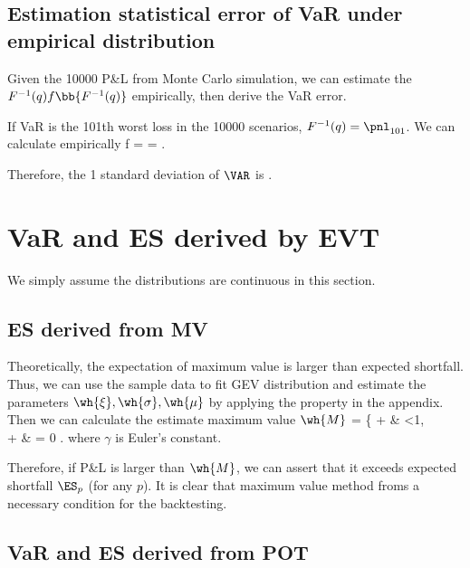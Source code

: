 \subsection{Estimation statistical error of VaR under empirical distribution}

Given the 10000 P\&L from Monte Carlo simulation, we can estimate the $F^{-1}(q)f\bb{F^{-1}(q)}$ empirically, then derive the VaR error.

If VaR is the 101th worst loss in the 10000 scenarios, $F^{-1}(q)= \pnl_{101}$. We can calculate empirically
\be
f =  = .
\ee

Therefore, the 1 standard deviation of $\VAR$ is
\be
{} \approx {} \approx {}   \cdot {}.
\ee


\section{VaR and ES derived by EVT}

We simply assume the distributions are continuous in this section.

\subsection{ES derived from MV}

Theoretically, the expectation of maximum value is larger than expected shortfall. Thus, we can use the sample data to fit GEV distribution and estimate the parameters $\wh{\xi},\wh{\sigma},\wh{\mu}$ by applying the property in the appendix. Then we can calculate the estimate maximum value $\wh{M}$
\be
{} = \left\{
\wh{\mu} + \wh{\sigma} \quad\quad & \wh{\xi} <1,\wh{\xi} \\
\wh{\mu} + \wh{\sigma} \gamma & \wh{\xi} = 0
\ea\right.
\ee
where $\gamma$ is Euler's constant.

Therefore, if P\&L is larger than $\wh{M}$, we can assert that it exceeds expected shortfall $\ES_p$ (for any $p$). It is clear that maximum value method froms a necessary condition for the backtesting.

\subsection{VaR and ES derived from POT}

